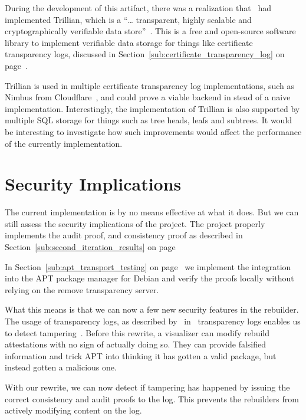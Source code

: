\documentclass[../Main/thesis.tex]{subfiles}
\begin{document}
During the development of this artifact, there was a realization
that~\citeauthor{trillian} had implemented Trillian, which is a ``\ldots
transparent, highly scalable and cryptographically verifiable data
store''~\cite{trillian}. This is a free and open-source software library to
implement verifiable data storage for things like certificate transparency logs,
discussed in Section~\ref{sub:certificate_transparency_log} on
page~\pageref{sub:certificate_transparency_log}.

Trillian is used in multiple certificate transparency log implementations, such
as Nimbus from Cloudflare~\cite{nimbus}, and could prove a viable backend in
stead of a naive implementation. Interestingly, the implementation of Trillian
is also supported by multiple SQL storage for things such as tree heads, leafs
and subtrees. It would be interesting to investigate how such improvements would
affect the performance of the currently implementation.

\section{Security Implications}%
\label{sec:security_implications}
The current implementation is by no means effective at what it does. But we can
still assess the security implications of the project. The project properly
implements the audit proof, and consistency proof as described in
Section~\ref{sub:second_iteration_results} on
page~\pageref{sub:second_iteration_results}

In Section~\ref{sub:apt_transport_testing} on
page~\pageref{sub:apt_transport_testing} we implement the integration into the
APT package manager for Debian and verify the proofs locally without relying on
the remove transparency server.

What this means is that we can now a few new security features in the rebuilder.
The usage of transparency logs, as described by~\citeauthor{182788} in~
transparency logs enables us to detect tampering~\cite{182788}. Before this
rewrite, a visualizer can modify rebuild attestations with no sign of actually
doing so. They can provide falsified information and trick APT into thinking it
has gotten a valid package, but instead gotten a malicious one.

With our rewrite, we can now detect if tampering has happened by issuing the
correct consistency and audit proofs to the log. This prevents the rebuilders
from actively modifying content on the log.
\end{document}
